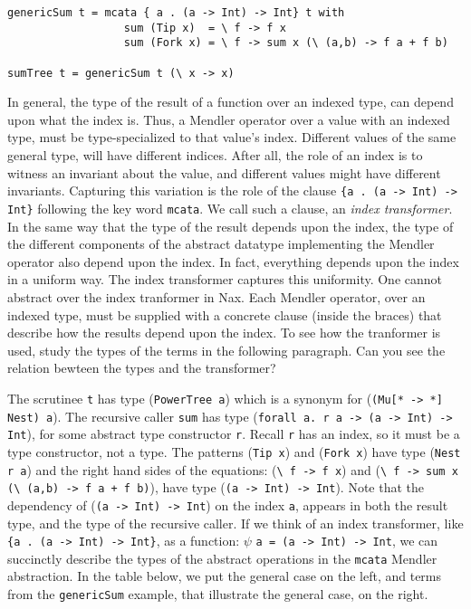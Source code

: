 {\small
\begin{verbatim}
genericSum t = mcata { a . (a -> Int) -> Int} t with
                  sum (Tip x)  = \ f -> f x
                  sum (Fork x) = \ f -> sum x (\ (a,b) -> f a + f b)

sumTree t = genericSum t (\ x -> x)
\end{verbatim}

In general, the type of the result of a function over an indexed type,
can depend upon what the index is. Thus, a Mendler operator over a value
with an indexed type, must be type-specialized to that value's index. Different values of the
same general type, will have different indices. After all, the role of
an index is to witness an invariant about the value, and different
values might have different invariants. Capturing this variation is the role of 
the  clause \verb+{a . (a -> Int) -> Int}+ following the key word \verb+mcata+. 
We call such a clause, an {\it index transformer}. In
the same way that the type of the result depends upon the index, the type of
the different components of the abstract datatype implementing the Mendler
operator also depend upon the index. In fact, everything depends upon the index
in a uniform way. The index transformer captures this uniformity.
One cannot abstract over the index tranformer in Nax. Each Mendler operator, over
an indexed type, must be supplied with a concrete clause (inside the braces)
that describe how the results depend upon the index. To see how the tranformer
is used, study the types of the terms in the following paragraph. Can you
see the relation bewteen the types and the transformer?

The scrutinee \verb+t+ has type (\verb+PowerTree a+) which is a synonym for
(\verb+(Mu[* -> *] Nest) a+). The recursive caller
\verb+sum+ has type (\verb+forall a. r a -> (a -> Int) -> Int+), for some abstract
type constructor \verb+r+. Recall \verb+r+ has an index, so it must be a type constructor, not a type. 
The patterns (\verb+Tip x+) and (\verb+Fork x+) have type
(\verb+Nest r a+) and the right hand sides of the equations:
(\verb+\ f -> f x+) and (\verb!\ f -> sum x (\ (a,b) -> f a + f b)!), have type
(\verb+(a -> Int) -> Int+). Note that the dependency of (\verb+(a -> Int) -> Int+) on
the index \verb+a+, appears in both the result type, and the type of the recursive caller.
If we think of an index transformer, like \verb+{a . (a -> Int) -> Int}+, as a function:
$\psi$ \verb+a = (a -> Int) -> Int+, we can succinctly
describe the types of the abstract operations in the \verb+mcata+ Mendler abstraction.
In the table below, we put the general case on the left, and
terms from the \verb+genericSum+ example, that illustrate the general case, on the right.

}
